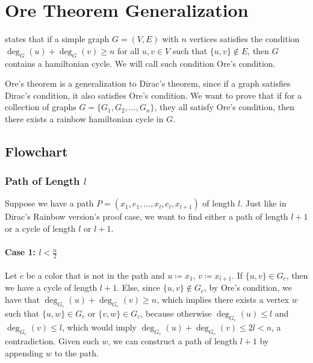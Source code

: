 
\chapter{Ore Theorem Generalization}

\cite{Ore_1960} states that if a simple graph $G = (V, E)$ with $n$ vertices satisfies the condition 
$\deg_G(u) + \deg_G(v) \geq n$ for all $u, v \in V$ such that $\{u, v\} \not\in E$, then $G$ contains a hamiltonian cycle.
We will call such condition Ore's condition.

Ore's theorem is a generalization to Dirac's theorem, since if a graph satisfies Dirac's condition, it also satisfies Ore's condition.
We want to prove that if for a collection of graphs $G = \{G_1, G_2, \ldots, G_n\}$, they all satisfy Ore's condition, 
then there exists a rainbow hamiltonian cycle in \(G\).

\section{Flowchart}

\subsection{Path of Length $l$}

Suppose we have a path \( P = (x_1, e_1, \dots, x_{l}, e_{l}, x_{l + 1}) \) of length \( l \). 
Just like in Dirac's Rainbow version's proof case, 
we want to find either a path of length \( l+1 \) or a cycle of length \( l \) or \( l+1 \). 

\subsubsection{Case 1: \( l < \frac{n}{2} \)}

Let \( c \) be a color that is not in the path and \(u \coloneqq x_1\), \(v \coloneqq x_{l+1}\). 
If \( \{u, v\} \in G_c \), then we have a cycle of length \( l+1 \).
Else, since \( \{u, v\} \not\in G_c \), by Ore's condition, 
we have that \( \deg_{G_c}(u) + \deg_{G_c}(v) \geq n \), which implies there exists a 
vertex \( w \) such that \( \{u, w\} \in G_c \) or \( \{v, w\} \in G_c \), because otherwise
\( \deg_{G_c}(u) \leq l  \) and \( \deg_{G_c}(v) \leq l \), 
which would imply \( \deg_{G_c}(u) + \deg_{G_c}(v) \leq 2l < n \), a contradiction.
Given such \(w\), we can construct a path of length \( l+1 \) by appending \(w\) to the path.

